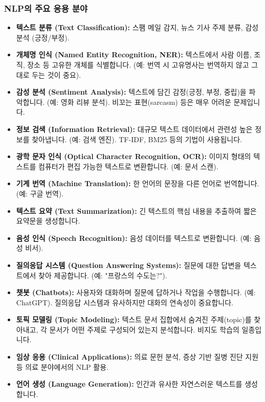 \documentclass[11pt,a4paper]{article}
\begin{document}
\subsubsection{NLP의 주요 응용 분야}
\begin{itemize}
    \item \textbf{텍스트 분류 (Text Classification):} 스팸 메일 감지, 뉴스 기사 주제 분류, 감성 분석 (긍정/부정).
    \item \textbf{개체명 인식 (Named Entity Recognition, NER):} 텍스트에서 사람 이름, 조직, 장소 등 고유한 개체를 식별합니다. (예: 번역 시 고유명사는 번역하지 않고 그대로 두는 것이 중요).
    \item \textbf{감성 분석 (Sentiment Analysis):} 텍스트에 담긴 감정(긍정, 부정, 중립)을 파악합니다. (예: 영화 리뷰 분석). 비꼬는 표현(sarcasm) 등은 매우 어려운 문제입니다.
    \item \textbf{정보 검색 (Information Retrieval):} 대규모 텍스트 데이터에서 관련성 높은 정보를 찾아냅니다. (예: 검색 엔진). TF-IDF, BM25 등의 기법이 사용됩니다.
    \item \textbf{광학 문자 인식 (Optical Character Recognition, OCR):} 이미지 형태의 텍스트를 컴퓨터가 편집 가능한 텍스트로 변환합니다. (예: 문서 스캔).
    \item \textbf{기계 번역 (Machine Translation):} 한 언어의 문장을 다른 언어로 번역합니다. (예: 구글 번역).
    \item \textbf{텍스트 요약 (Text Summarization):} 긴 텍스트의 핵심 내용을 추출하여 짧은 요약문을 생성합니다.
    \item \textbf{음성 인식 (Speech Recognition):} 음성 데이터를 텍스트로 변환합니다. (예: 음성 비서).
    \item \textbf{질의응답 시스템 (Question Answering Systems):} 질문에 대한 답변을 텍스트에서 찾아 제공합니다. (예: "프랑스의 수도는?").
    \item \textbf{챗봇 (Chatbots):} 사용자와 대화하며 질문에 답하거나 작업을 수행합니다. (예: ChatGPT). 질의응답 시스템과 유사하지만 대화의 연속성이 중요합니다.
    \item \textbf{토픽 모델링 (Topic Modeling):} 텍스트 문서 집합에서 숨겨진 주제(topic)를 찾아내고, 각 문서가 어떤 주제로 구성되어 있는지 분석합니다. 비지도 학습의 일종입니다.
    \item \textbf{임상 응용 (Clinical Applications):} 의료 문헌 분석, 증상 기반 질병 진단 지원 등 의료 분야에서의 NLP 활용.
    \item \textbf{언어 생성 (Language Generation):} 인간과 유사한 자연스러운 텍스트를 생성합니다.
\end{itemize}
\end{document}

